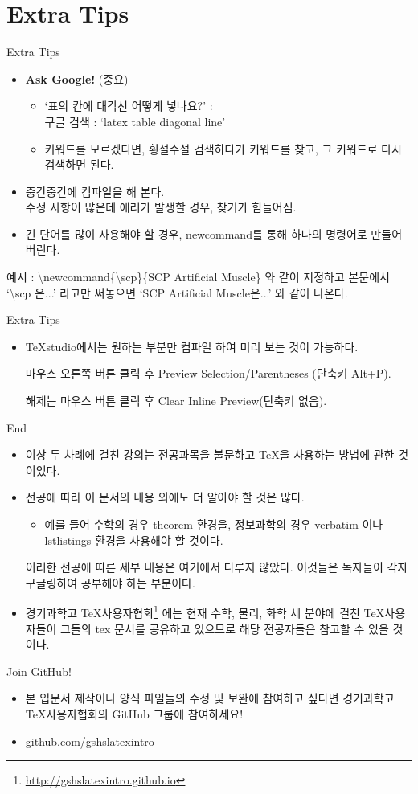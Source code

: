 \documentclass[12pt]{beamer}
\begin{document}
\section{Extra Tips}
\begin{frame}{Extra Tips}
	\begin{itemize}
		\item \textbf{Ask Google!} (중요)
		\begin{itemize}
			\item `표의 칸에 대각선 어떻게 넣나요?' : \\
			구글 검색 : `latex table diagonal line'
			\item 키워드를 모르겠다면, 횡설수설 검색하다가 키워드를 찾고, 그 키워드로 다시 검색하면 된다.
		\end{itemize}
		\item 중간중간에 컴파일을 해 본다. \\
		수정 사항이 많은데 에러가 발생할 경우, 찾기가 힘들어짐.
		\item 긴 단어를 많이 사용해야 할 경우, newcommand를 통해 하나의 명령어로 만들어 버린다.
	\end{itemize}
	\begin{footnotesize}
		예시 : \textbackslash newcommand\{\textbackslash scp\}\{SCP Artificial Muscle\} 와 같이 지정하고 본문에서 `\textbackslash scp 은...' 라고만 써놓으면 `SCP Artificial Muscle은...' 와 같이 나온다.
	\end{footnotesize}
\end{frame}
\begin{frame}{Extra Tips}
	\begin{itemize}
		\item TeXstudio에서는 원하는 부분만 컴파일 하여 미리 보는 것이 가능하다. 
		
		마우스 오른쪽 버튼 클릭 후 Preview Selection/Parentheses (단축키 Alt+P).
		
		해제는 마우스 버튼 클릭 후 Clear Inline Preview(단축키 없음).
	\end{itemize}
\end{frame}
\begin{frame}{End}
	\begin{itemize}
		\item 이상 두 차례에 걸친 강의는 전공과목을 불문하고 \TeX 을 사용하는 방법에 관한 것이었다.
		\item 전공에 따라 이 문서의 내용 외에도 더 알아야 할 것은 많다. 
		\begin{itemize}
			\item 예를 들어 수학의 경우 theorem 환경을, 정보과학의 경우 verbatim 이나 lstlistings 환경을 사용해야 할 것이다.
		\end{itemize}
		이러한 전공에 따른 세부 내용은 여기에서 다루지 않았다. 이것들은 독자들이 각자 구글링하여 공부해야 하는 부분이다.
		\item 경기과학고 \TeX 사용자협회\footnote{\url{http://gshslatexintro.github.io}}  에는 현재 수학, 물리, 화학 세 분야에 걸친 \TeX 사용자들이 그들의 tex 문서를 공유하고 있으므로 해당 전공자들은 참고할 수 있을 것이다.
	\end{itemize}
\end{frame}
\begin{frame}{Join GitHub!}
	\begin{itemize}
		\item 본 입문서 제작이나 양식 파일들의 수정 및 보완에 참여하고 싶다면 경기과학고 \TeX 사용자협회의 GitHub 그룹에 참여하세요!
		\item \url{github.com/gshslatexintro}
	\end{itemize}
\end{frame}
\end{document}
